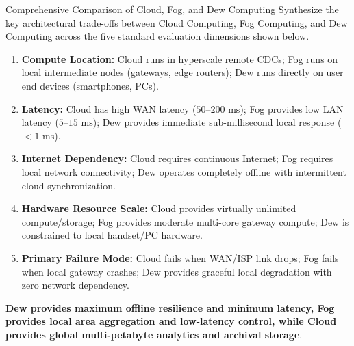 \begin{solved}{Comprehensive Comparison of Cloud, Fog, and Dew Computing}
\Given Synthesize the key architectural trade-offs between Cloud Computing, Fog Computing, and Dew Computing across the five standard evaluation dimensions shown below.
\Steps
\begin{enumerate}[leftmargin=*]
  \item \textbf{Compute Location:} Cloud runs in hyperscale remote CDCs; Fog runs on local intermediate nodes (gateways, edge routers); Dew runs directly on user end devices (smartphones, PCs).
  \item \textbf{Latency:} Cloud has high WAN latency ($50\text{--}200\text{ ms}$); Fog provides low LAN latency ($5\text{--}15\text{ ms}$); Dew provides immediate sub-millisecond local response ($< 1\text{ ms}$).
  \item \textbf{Internet Dependency:} Cloud requires continuous Internet; Fog requires local network connectivity; Dew operates completely offline with intermittent cloud synchronization.
  \item \textbf{Hardware Resource Scale:} Cloud provides virtually unlimited compute/storage; Fog provides moderate multi-core gateway compute; Dew is constrained to local handset/PC hardware.
  \item \textbf{Primary Failure Mode:} Cloud fails when WAN/ISP link drops; Fog fails when local gateway crashes; Dew provides graceful local degradation with zero network dependency.
\end{enumerate}
\Answer \textbf{Dew provides maximum offline resilience and minimum latency, Fog provides local area aggregation and low-latency control, while Cloud provides global multi-petabyte analytics and archival storage}.
\end{solved}

